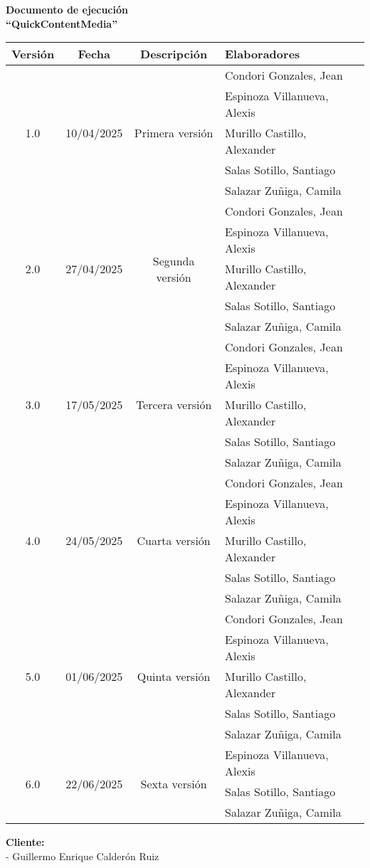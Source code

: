 \documentclass[11pt]{report}
\newcommand{\customtitle}{
    \begin{titlepage}
    \begin{center}
        \Huge \textbf{Documento de ejecución} \\[0.5em]
        \LARGE \textbf{``QuickContentMedia''} \\[2.5em]

        \renewcommand{\arraystretch}{1.1}
        {\small
        \begin{tabularx}{\textwidth}{|c|c|c|X|}
            \hline
                \rowcolor{gray!30}
                \textbf{Versión} & \textbf{Fecha} & \textbf{Descripción} & \textbf{Elaboradores} \\
            \hline
                \multirow{5}{*}{1.0} & 
                \multirow{5}{*}{10/04/2025} & 
                \multirow{5}{*}{Primera versión} & Condori Gonzales, Jean \\
                     &  &  & Espinoza Villanueva, Alexis \\
                     &  &  & Murillo Castillo, Alexander \\
                     &  &  & Salas Sotillo, Santiago  \\
                     &  &  & Salazar Zuñiga, Camila \\
            \hline
                \multirow{5}{*}{2.0} & 
                \multirow{5}{*}{27/04/2025} & 
                \multirow{5}{*}{Segunda versión} & Condori Gonzales, Jean \\
                     &  &  & Espinoza Villanueva, Alexis \\
                     &  &  & Murillo Castillo, Alexander \\
                     &  &  & Salas Sotillo, Santiago  \\
                     &  &  & Salazar Zuñiga, Camila \\
            \hline
                \multirow{5}{*}{3.0} & 
                \multirow{5}{*}{17/05/2025} & 
                \multirow{5}{*}{Tercera versión} & Condori Gonzales, Jean \\
                     &  &  & Espinoza Villanueva, Alexis \\
                     &  &  & Murillo Castillo, Alexander \\
                     &  &  & Salas Sotillo, Santiago  \\
                     &  &  & Salazar Zuñiga, Camila \\
            \hline
                \multirow{5}{*}{4.0} & 
                \multirow{5}{*}{24/05/2025} & 
                \multirow{5}{*}{Cuarta versión} & Condori Gonzales, Jean \\
                     &  &  & Espinoza Villanueva, Alexis \\
                     &  &  & Murillo Castillo, Alexander \\
                     &  &  & Salas Sotillo, Santiago  \\
                     &  &  & Salazar Zuñiga, Camila \\
            \hline
                \multirow{5}{*}{5.0} & 
                \multirow{5}{*}{01/06/2025} & 
                \multirow{5}{*}{Quinta versión} & Condori Gonzales, Jean \\
                     &  &  & Espinoza Villanueva, Alexis \\
                     &  &  & Murillo Castillo, Alexander \\
                     &  &  & Salas Sotillo, Santiago  \\
                     &  &  & Salazar Zuñiga, Camila \\
            \hline
                \multirow{5}{*}{6.0} & 
                \multirow{5}{*}{22/06/2025} & 
                \multirow{5}{*}{Sexta versión} & Espinoza Villanueva, Alexis \\
                     &  &  & Salas Sotillo, Santiago  \\
                     &  &  & Salazar Zuñiga, Camila \\
            \hline
        \end{tabularx}
        }

        \vfill %
        \raggedright
        \large \textbf{Cliente:} \\
        - Guillermo Enrique Calderón Ruiz
    \end{center}
    \end{titlepage}
}
\begin{document}
\customtitle

\tableofcontents



















\nocite{*}
\printbibliography
\end{document}
